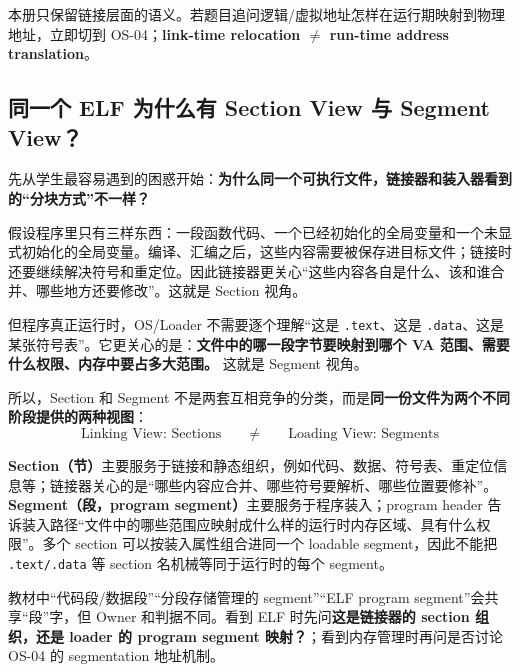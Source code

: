 \documentclass[11pt,a4paper]{ctexart}
\newcommand{\kw}[1]{\textbf{#1}}
\newcommand{\code}[1]{\texttt{#1}}
\begin{document}
本册只保留链接层面的语义。若题目追问逻辑/虚拟地址怎样在运行期映射到物理地址，立即切到 OS-04；\kw{link-time relocation $\neq$ run-time address translation}。

\subsection{同一个 ELF 为什么有 Section View 与 Segment View？}

先从学生最容易遇到的困惑开始：\kw{为什么同一个可执行文件，链接器和装入器看到的“分块方式”不一样？}

假设程序里只有三样东西：一段函数代码、一个已经初始化的全局变量和一个未显式初始化的全局变量。编译、汇编之后，这些内容需要被保存进目标文件；链接时还要继续解决符号和重定位。因此链接器更关心“这些内容各自是什么、该和谁合并、哪些地方还要修改”。这就是 Section 视角。

但程序真正运行时，OS/Loader 不需要逐个理解“这是 \code{.text}、这是 \code{.data}、这是某张符号表”。它更关心的是：\kw{文件中的哪一段字节要映射到哪个 VA 范围、需要什么权限、内存中要占多大范围。} 这就是 Segment 视角。

所以，Section 和 Segment 不是两套互相竞争的分类，而是\kw{同一份文件为两个不同阶段提供的两种视图}：
\[
\boxed{
\text{Linking View: Sections}
\qquad\neq\qquad
\text{Loading View: Segments}
}
\]

\kw{Section（节）}主要服务于链接和静态组织，例如代码、数据、符号表、重定位信息等；链接器关心的是“哪些内容应合并、哪些符号要解析、哪些位置要修补”。\kw{Segment（段，program segment）}主要服务于程序装入；program header 告诉装入路径“文件中的哪些范围应映射成什么样的运行时内存区域、具有什么权限”。多个 section 可以按装入属性组合进同一个 loadable segment，因此不能把 \code{.text/.data} 等 section 名机械等同于运行时的每个 segment。

\begin{warn}
教材中“代码段/数据段”“分段存储管理的 segment”“ELF program segment”会共享“段”字，但 Owner 和判据不同。看到 ELF 时先问\kw{这是链接器的 section 组织，还是 loader 的 program segment 映射？}；看到内存管理时再问是否讨论 OS-04 的 segmentation 地址机制。
\end{warn}
\end{document}
